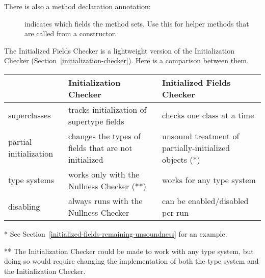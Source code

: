 There is also a method declaration annotation:

\begin{description}
\item[]
  indicates which fields the method sets.  Use this for helper methods that
  are called from a constructor.
\end{description}



The Initialized Fields Checker is a lightweight version of the  Initialization Checker
(Section~\ref{initialization-checker}).  Here is a comparison between them.

\noindent
\begin{small}
\begin{tabular}{| l | l | l |}
 \hline
 & Initialization Checker & Initialized Fields Checker
 \\ \hline
 superclasses
 & tracks initialization of supertype fields
 & checks one class at a time
 \\
 partial initialization
 & changes the types of fields that are not initialized
 & unsound treatment of partially-initialized objects (*)
 \\
 type systems
 & works only with the Nullness Checker (**)
 & works for any type system
 \\
 disabling
 & always runs with the Nullness Checker
 & can be enabled/disabled per run
 \\
 \hline
\end{tabular}

\noindent
* See Section~\ref{initialized-fields-remaining-unsoundness} for an example.

\noindent
** The Initialization Checker could be made to work with any type system, but
doing so would require changing the implementation of both the type system and
the Initialization Checker.
\end{small}


